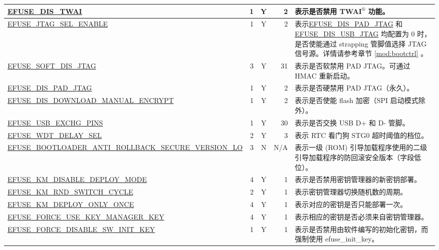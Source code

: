 \begin{longtable}[l]{ |m{8.5cm}|r|c|r|m{9.0cm}| }
    \hline
    \hyperref[fielddesc:EFUSEDISTWAI]{EFUSE\_DIS\_TWAI} & 1 & Y & 2 & 表示是否禁用 TWAI$^®$ 功能。\\
    \hline
    \hyperref[fielddesc:EFUSEJTAGSELENABLE]{EFUSE\_JTAG\_SEL\_ENABLE} & 1 & Y & 2 & 表示\hyperref[fielddesc:EFUSEDISPADJTAG]{EFUSE\_DIS\_PAD\_JTAG} 和 \hyperref[fielddesc:EFUSEDISUSBJTAG]{EFUSE\_DIS\_USB\_JTAG} 均配置为 0 时，是否使能通过 strapping 管脚值选择 JTAG 信号源。详情请参考章节 \ref{mod:bootctrl} \textit{\nameref{mod:bootctrl}}。\\
    \hline
    \hyperref[fielddesc:EFUSESOFTDISJTAG]{EFUSE\_SOFT\_DIS\_JTAG} & 3 & Y & 31 & 表示是否软禁用 PAD JTAG。可通过 HMAC 重新启动。\\
    \hline
    \hyperref[fielddesc:EFUSEDISPADJTAG]{EFUSE\_DIS\_PAD\_JTAG} & 1 & Y & 2 & 表示是否硬禁用 PAD JTAG（永久）。\\
    \hline
    \hyperref[fielddesc:EFUSEDISDOWNLOADMANUALENCRYPT]{EFUSE\_DIS\_DOWNLOAD\_MANUAL\_ENCRYPT} &  1 & Y & 2 & 表示是否使能 flash 加密（SPI 启动模式除外）。\\
    \hline
    \hyperref[fielddesc:EFUSEUSBEXCHGPINS]{EFUSE\_USB\_EXCHG\_PINS}  & 1 & Y & 30  & 表示是否交换 USB D+ 和 D- 管脚。\\
    \hline
    \hyperref[fielddesc:EFUSEWDTDELAYSEL]{EFUSE\_WDT\_DELAY\_SEL} & 2 & Y & 3 & 表示 RTC 看门狗 STG0 超时阈值的档位。\\
    \hline
    \hyperref[fielddesc:EFUSEBOOTLOADERANTIROLLBACKSECUREVERSIONLO]{EFUSE\_\-BOOTLOADER\_\-ANTI\_\-ROLLBACK\_\-SECURE\_\-VERSION\_\-LO} & 3 & N & N/A & 表示一级 (ROM) 引导加载程序使用的二级引导加载程序的防回滚安全版本（字段低位）。 \\ \hline
    \hyperref[fielddesc:EFUSEKMDISABLEDEPLOYMODE]{EFUSE\_KM\_DISABLE\_DEPLOY\_MODE} & 4 & Y & 1 & 表示是否禁用密钥管理器的新密钥部署。  \\ \hline
    \hyperref[fielddesc:EFUSEKMRNDSWITCHCYCLE]{EFUSE\_KM\_RND\_SWITCH\_CYCLE} & 2 & Y & 1 & 表示密钥管理器切换随机数的周期。 \\ \hline
    \hyperref[fielddesc:EFUSEKMDEPLOYONLYONCE]{EFUSE\_KM\_DEPLOY\_ONLY\_ONCE} & 4 & Y & 1 & 表示对应的密钥是否只能部署一次。 \\ \hline
    \hyperref[fielddesc:EFUSEFORCEUSEKEYMANAGERKEY]{EFUSE\_FORCE\_USE\_KEY\_MANAGER\_KEY} & 4 & Y & 1 & 表示相应的密钥是否必须来自密钥管理器。  \\ \hline
    \hyperref[fielddesc:EFUSEFORCEDISABLESWINITKEY]{EFUSE\_FORCE\_DISABLE\_SW\_INIT\_KEY} & 1 & Y & 1 & 表示是否禁用由软件编写的初始化密钥，而强制使用 efuse\_init\_key。 \\ \hline

\end{longtable}
